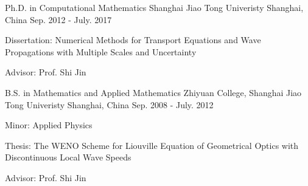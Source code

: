 

\begin{cventries}

  \cventry
    {Ph.D. in Computational Mathematics} %
    {Shanghai Jiao Tong Univeristy} %
    {Shanghai, China} %
    {Sep. 2012 - July. 2017} %
    {
      \begin{cvitems} %
        \item {Dissertation: Numerical Methods for Transport Equations and Wave Propagations with Multiple Scales and Uncertainty}
        \item {Advisor: Prof. Shi Jin}
      \end{cvitems}
    }

  \cventry
    {B.S. in Mathematics and Applied Mathematics} %
    {Zhiyuan College, Shanghai Jiao Tong Univeristy} %
    {Shanghai, China} %
    {Sep. 2008 - July. 2012} %
    {
      \begin{cvitems} %
        \item {Minor: Applied Physics}
        \item {Thesis: The WENO Scheme for Liouville Equation of Geometrical Optics with Discontinuous Local Wave Speeds}
        \item {Advisor: Prof. Shi Jin}
      \end{cvitems}
    }

\end{cventries}
